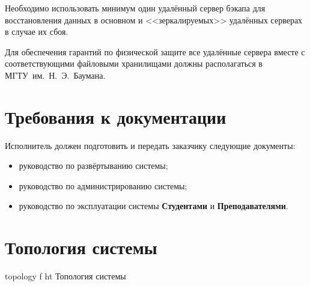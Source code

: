\documentclass{bmstu}
\begin{document}
  Необходимо использовать минимум один удалённый сервер бэкапа для восстановления данных в основном и <<зеркалируемых>> удалённых серверах в случае их сбоя.
  
  Для обеспечения гарантий по физической защите все удалённые сервера вместе с соответствующими файловыми хранилищами должны располагаться в МГТУ~им.~Н.~Э.~Баумана.

  \section{Требования к документации}

  Исполнитель должен подготовить и передать заказчику следующие
  документы:
  \begin{itemize}[label=---]
    \item руководство по развёртыванию системы;
    \item руководство по администрированию системы;
    \item руководство по эксплуатации системы \textbf{Студентами} и
      \textbf{Преподавателями}.
  \end{itemize}

  \section{Топология системы}

    {topology}
    {f}
    {ht}
    {\textwidth}
    {Топология системы}

  \FloatBarrier
  
%
%
%
\end{document}
